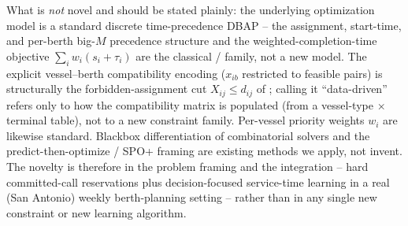 What is \emph{not} novel and should be stated plainly: the underlying
optimization model is a standard discrete time-precedence DBAP -- the
assignment, start-time, and per-berth big-$M$ precedence structure and the
weighted-completion-time objective $\sum_i w_i(s_i+\tau_i)$ are the classical
\citet{cordeau2005berth} / \citet{alzaabi2016berth} family, not a new model. The
explicit vessel--berth compatibility encoding ($x_{ib}$ restricted to feasible
pairs) is structurally the forbidden-assignment cut $X_{ij}\le d_{ij}$ of
\citet{alzaabi2016berth}; calling it ``data-driven'' refers only to how the
compatibility matrix is populated (from a vessel-type $\times$ terminal table),
not to a new constraint family. Per-vessel priority weights $w_i$ are likewise
standard. Blackbox differentiation of combinatorial solvers
\citep{pogancic2020blackbox} and the predict-then-optimize / SPO+ framing
\citep{elmachtoub2022spo} are existing methods we apply, not invent. The novelty
is therefore in the problem framing and the integration -- hard committed-call
reservations plus decision-focused service-time learning in a real (San Antonio)
weekly berth-planning setting -- rather than in any single new constraint or new
learning algorithm.
